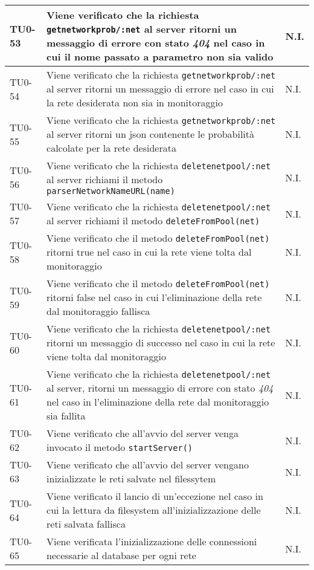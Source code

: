 \begin{longtable}{|C{.15\textwidth}|m{.65\textwidth}|C{.20\textwidth}|}
\hline 
TU0-53 & Viene verificato che la richiesta \texttt{getnetworkprob/:net} al server ritorni un messaggio di errore con stato \textit{404} nel caso in cui il nome passato a parametro non sia valido & N.I. \\ 
\hline
{} TU0-54 & Viene verificato che la richiesta \texttt{getnetworkprob/:net} al server ritorni un messaggio di errore nel caso in cui la rete desiderata non sia in monitoraggio & N.I. \\ 
\hline 
TU0-55 & Viene verificato che la richiesta \texttt{getnetworkprob/:net} al server ritorni un json contenente le probabilità calcolate per la rete desiderata & N.I. \\ 
\hline 
{} TU0-56 & Viene verificato che la richiesta \texttt{deletenetpool/:net} al server richiami il metodo \texttt{parserNetworkNameURL(name)} & N.I. \\ 
\hline
TU0-57 & Viene verificato che la richiesta \texttt{deletenetpool/:net} al server richiami il metodo \texttt{deleteFromPool(net)} & N.I. \\ 
\hline 
{} TU0-58 & Viene verificato che il metodo \texttt{deleteFromPool(net)} ritorni true nel caso in cui la rete viene tolta dal monitoraggio & N.I. \\ 
\hline
TU0-59 & Viene verificato che il metodo \texttt{deleteFromPool(net)} ritorni false nel caso in cui l'eliminazione della rete dal monitoraggio fallisca & N.I. \\ 
\hline 
{} TU0-60 & Viene verificato che la richiesta \texttt{deletenetpool/:net} ritorni un messaggio di successo nel caso in cui la rete viene tolta dal monitoraggio & N.I. \\ 
\hline 
TU0-61 & Viene verificato che la richiesta \texttt{deletenetpool/:net} al server, ritorni un messaggio di errore con stato \textit{404} nel caso in l'eliminazione della rete dal monitoraggio sia fallita & N.I. \\ 
\hline 
{} TU0-62 & Viene verificato che all'avvio del server venga invocato il metodo \texttt{startServer()} & N.I. \\ 
\hline
TU0-63 & Viene verificato che all'avvio del server vengano inizializzate le reti salvate nel filessytem & N.I. \\ 
\hline
{}TU0-64 & Viene verificato il lancio di un'eccezione nel caso in cui la lettura da filesystem all'inizializzazione delle reti salvata fallisca & N.I. \\ 
\hline
TU0-65 & Viene verificata l'inizializzazione delle connessioni necessarie al database per ogni rete & N.I. \\ 

\end{longtable}
